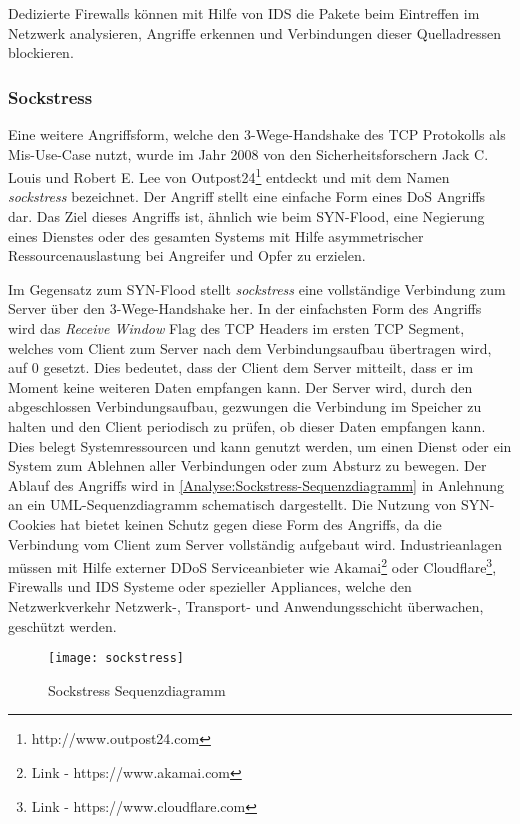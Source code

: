 Dedizierte Firewalls können mit Hilfe von \ac{IDS} die Pakete beim Eintreffen im Netzwerk analysieren, Angriffe erkennen und Verbindungen dieser Quelladressen blockieren.

\subsubsection{Sockstress}
Eine weitere Angriffsform, welche den 3-Wege-Handshake des \ac{TCP} Protokolls als Mis-Use-Case nutzt, wurde im Jahr 2008 von den Sicherheitsforschern Jack C. Louis und Robert E. Lee von Outpost24\footnote{http://www.outpost24.com} entdeckt und mit dem Namen \textit{sockstress} bezeichnet. Der Angriff stellt eine einfache Form eines \ac{DoS} Angriffs dar. Das Ziel dieses Angriffs ist, ähnlich wie beim SYN-Flood, eine Negierung eines Dienstes oder des gesamten Systems mit Hilfe asymmetrischer Ressourcenauslastung bei Angreifer und Opfer zu erzielen.

Im Gegensatz zum SYN-Flood stellt \textit{sockstress} eine vollständige Verbindung zum Server über den 3-Wege-Handshake her. In der einfachsten Form des Angriffs wird das \textit{Receive Window} Flag des \ac{TCP} Headers im ersten \ac{TCP} Segment, welches vom Client zum Server nach dem Verbindungsaufbau übertragen wird, auf 0 gesetzt. Dies bedeutet, dass der Client dem Server mitteilt, dass er im Moment keine weiteren Daten empfangen kann. Der Server wird, durch den abgeschlossen Verbindungsaufbau, gezwungen die Verbindung im Speicher zu halten und den Client periodisch zu prüfen, ob dieser Daten empfangen kann. Dies belegt Systemressourcen und kann genutzt werden, um einen Dienst oder ein System zum Ablehnen aller Verbindungen oder zum Absturz zu bewegen. Der Ablauf des Angriffs wird in \autoref{Analyse:Sockstress-Sequenzdiagramm} in Anlehnung an ein \ac{UML}-Sequenzdiagramm schematisch dargestellt. Die Nutzung von SYN-Cookies hat bietet keinen Schutz gegen diese Form des Angriffs, da die Verbindung vom Client zum Server vollständig aufgebaut wird. Industrieanlagen müssen mit Hilfe externer \ac{DDoS} Serviceanbieter wie Akamai\footnote{Link - https://www.akamai.com} oder Cloudflare\footnote{Link - https://www.cloudflare.com}, Firewalls und \ac{IDS} Systeme oder spezieller Appliances, welche den Netzwerkverkehr Netzwerk-, Transport- und Anwendungsschicht überwachen, geschützt werden.

\begin{figure}[h]
  \centering
  \texttt{[image: sockstress]}
  \caption{Sockstress Sequenzdiagramm}
  \label{Analyse:Sockstress-Sequenzdiagramm}
\end{figure}

